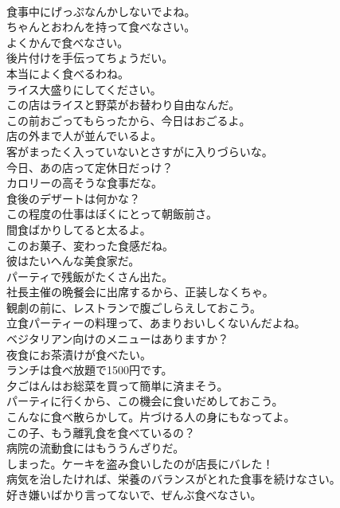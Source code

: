 \documentclass[8pt]{extreport}
\begin{document}
\begin{CJK}{UTF8}{min}
\\	食事中にげっぷなんかしないでよね。	
\\	ちゃんとおわんを持って食べなさい。	
\\	よくかんで食べなさい。	
\\	後片付けを手伝ってちょうだい。	
\\	本当によく食べるわね。	
\\	ライス大盛りにしてください。	
\\	この店はライスと野菜がお替わり自由なんだ。	
\\	この前おごってもらったから、今日はおごるよ。	
\\	店の外まで人が並んでいるよ。	
\\	客がまったく入っていないとさすがに入りづらいな。	
\\	今日、あの店って定休日だっけ？	
\\	カロリーの高そうな食事だな。	
\\	食後のデザートは何かな？	
\\	この程度の仕事はぼくにとって朝飯前さ。	
\\	間食ばかりしてると太るよ。	
\\	このお菓子、変わった食感だね。	
\\	彼はたいへんな美食家だ。	
\\	パーティで残飯がたくさん出た。	
\\	社長主催の晩餐会に出席するから、正装しなくちゃ。	
\\	観劇の前に、レストランで腹ごしらえしておこう。	
\\	立食パーティーの料理って、あまりおいしくないんだよね。	
\\	ベジタリアン向けのメニューはありますか？	
\\	夜食にお茶漬けが食べたい。	
\\	ランチは食べ放題で1500円です。	
\\	夕ごはんはお総菜を買って簡単に済まそう。	
\\	パーティに行くから、この機会に食いだめしておこう。	
\\	こんなに食べ散らかして。片づける人の身にもなってよ。	
\\	この子、もう離乳食を食べているの？	
\\	病院の流動食にはもううんざりだ。	
\\	しまった。ケーキを盗み食いしたのが店長にバレた！	
\\	病気を治したければ、栄養のバランスがとれた食事を続けなさい。	
\\	好き嫌いばかり言ってないで、ぜんぶ食べなさい。	

\end{CJK}
\end{document}
